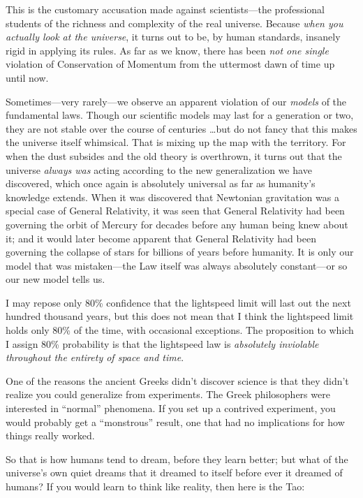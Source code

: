 {
 This is the customary accusation made against scientists---the
professional students of the richness and complexity of the real
universe. Because \textit{when you actually look at the universe}, it
turns out to be, by human standards, insanely rigid in applying its
rules. As far as we know, there has been \textit{not one single}
violation of Conservation of Momentum from the uttermost dawn of time
up until now.}

{
 Sometimes---very rarely---we observe an apparent violation of our
\textit{models} of the fundamental laws. Though our scientific models
may last for a generation or two, they are not stable over the course
of centuries \ldots but do not fancy that this makes the universe itself
whimsical. That is mixing up the map with the territory. For when the
dust subsides and the old theory is overthrown, it turns out that the
universe \textit{always was} acting according to the new generalization
we have discovered, which once again is absolutely universal as far as
humanity's knowledge extends. When it was discovered
that Newtonian gravitation was a special case of General Relativity, it
was seen that General Relativity had been governing the orbit of
Mercury for decades before any human being knew about it; and it would
later become apparent that General Relativity had been governing the
collapse of stars for billions of years before humanity. It is only our
model that was mistaken---the Law itself was always absolutely
constant---or so our new model tells us.}

{
 I may repose only 80\% confidence that the lightspeed limit will
last out the next hundred thousand years, but this does not mean that I
think the lightspeed limit holds only 80\% of the time, with occasional
exceptions. The proposition to which I assign 80\% probability is that
the lightspeed law is \textit{absolutely inviolable throughout the
entirety of space and time}.}

{
 One of the reasons the ancient Greeks didn't
discover science is that they didn't realize you could
generalize from experiments. The Greek philosophers were interested in
``normal'' phenomena. If you set up
a contrived experiment, you would probably get a
``monstrous'' result, one that had
no implications for how things really worked.}

{
 So that is how humans tend to dream, before they learn better; but
what of the universe's own quiet dreams that it dreamed
to itself before ever it dreamed of humans? If you would learn to think
like reality, then here is the Tao:}

